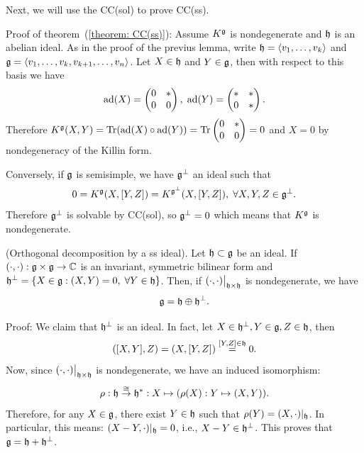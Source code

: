 Next, we will use the CC(sol) to prove CC(ss).\par
Proof of theorem~(\ref{theorem: CC(ss)}): Assume $K^{\mathfrak{g}}$ is nondegenerate and $\mathfrak{h}$ is an abelian ideal. 
As in the proof of the previus lemma, write $\mathfrak{h}=\langle v_1,\dots,v_k\rangle$ and 
$\mathfrak{g}=\langle v_1,\dots,v_k,v_{k+1},\dots,v_{n}\rangle$. Let $X\in\mathfrak{h}$ and $Y\in\mathfrak{g}$, then with respect 
to this basis we have 
\begin{equation}
    \text{ad}(X)=\begin{pmatrix}
        0&*\\0&0
    \end{pmatrix},\;
    \text{ad}(Y)=\begin{pmatrix}
        *&*\\0&*
    \end{pmatrix}.
\end{equation}
Therefore $K^{\mathfrak{g}}(X,Y)=\text{Tr}(\text{ad}(X)\circ\text{ad}(Y))=\text{Tr}\begin{pmatrix}0&*\\0&0\end{pmatrix}=0$ and $X=0$ by nondegeneracy of 
the Killin form.\par
Conversely, if $\mathfrak{g}$ is semisimple, we have $\mathfrak{g}^\perp$ an ideal such that 
\begin{equation}
    0=K^{\mathfrak{g}}(X,[Y,Z])=K^{\mathfrak{g}^\perp}(X,[Y,Z]),\;\forall X,Y,Z\in\mathfrak{g}^\perp.
\end{equation}
Therefore $\mathfrak{g}^\perp$ is solvable by CC(sol), so $\mathfrak{g}^\perp=0$ which means that $K^{\mathfrak{g}}$ is nondegenerate.

\begin{dang}
    \begin{lemma}\label{lemma: Orthogonal decomposition by a ss ideal}
        (Orthogonal decomposition by a ss ideal).
        Let $\mathfrak{h}\subset\mathfrak{g}$ be an ideal. If $(\cdot,\cdot):\mathfrak{g}\times\mathfrak{g}\to\mathbb{C}$ 
        is an invariant, symmetric bilinear form and 
        $\mathfrak{h}^{\perp}=\{X\in\mathfrak{g}:(X,Y)=0,\;\forall Y\in\mathfrak{h}\}$. Then, if $(\cdot,\cdot)\big|_{\mathfrak{h}\times\mathfrak{h}}$ 
        is nondegenerate, we have 
        \begin{equation}
            \mathfrak{g}=\mathfrak{h}\oplus\mathfrak{h}^\perp.
        \end{equation}
    \end{lemma}
\end{dang}
Proof: We claim that $\mathfrak{h}^{\perp}$ is an ideal. In fact, let $X\in\mathfrak{h}^\perp,Y\in\mathfrak{g},Z\in\mathfrak{h}$, then 
\begin{equation}
    ([X,Y],Z)=(X,[Y,Z])\overset{[Y,Z]\in\mathfrak{h}}{=}0.
\end{equation}
Now, since $(\cdot,\cdot)\big|_{\mathfrak{h}\times\mathfrak{h}}$ is nondegenerate, we have an induced isomorphism:
\begin{equation}
   \rho: \mathfrak{h}\overset{\cong}{\rightarrow}\mathfrak{h}^*:X\mapsto (\rho(X):Y\mapsto (X,Y)).
\end{equation}
Therefore, for any $X\in\mathfrak{g}$, there exist $Y\in\mathfrak{h}$ such that $\rho(Y)=(X,\cdot)|_{\mathfrak{h}}$. In particular, 
this means: $(X-Y,\cdot)|_{\mathfrak{h}}=0$, i.e., $X-Y\in\mathfrak{h}^\perp$. This proves that $\mathfrak{g}=\mathfrak{h}+\mathfrak{h}^\perp$.\par

